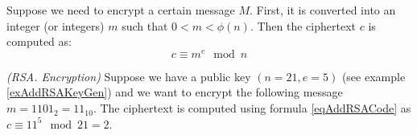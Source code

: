 Suppose we need to encrypt a certain message $M$. First, it is 
converted into an integer (or integers) $m$ such that 
$0 < m < \phi\left(n\right)$. Then the ciphertext 
$c$ is computed as:
\begin{equation}
c \equiv m^e \mod{n}
\label{eqAddRSACode}
\end{equation}

\begin{example}
\emph{(RSA. Encryption)}
Suppose we have a public key $\left(n=21, e=5\right)$ (see example \ref{exAddRSAKeyGen}) 
and we want to encrypt the following message $m = 1101_2 = 11_{10}$. 
The ciphertext is computed using formula \eqref{eqAddRSACode} as $c \equiv 11^5 \mod{21} = 2$.
\label{exAddRSACode}
\end{example}